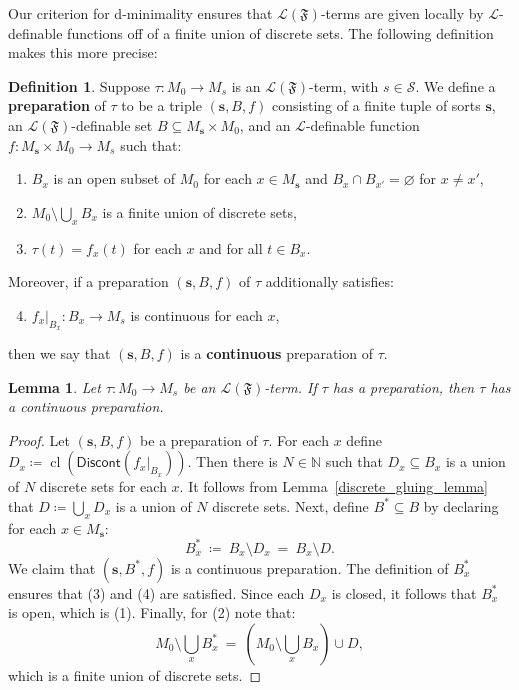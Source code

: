 \documentclass[11pt]{amsart}
\theoremstyle{plain}
\newtheorem{lemma}[thm]{Lemma}
\theoremstyle{definition}
\newtheorem{definition}[thm]{Definition}
\numberwithin{equation}{section}
\newcommand{\fr}{\mathfrak}
\newcommand\N{\mathbb{N}}
\newcommand\calL{\mathcal{L}}
\newcommand\calS{\mathcal{S}}
\newcommand\0{\varnothing}
\begin{document}
\noindent
Our criterion for d-minimality ensures that $\calL(\fr{F})$-terms are given locally by $\calL$-definable functions off of a finite union of discrete sets. The following definition makes this more precise:

\begin{definition}
Suppose $\tau\colon M_0\to M_s$ is an $\calL(\fr{F})$-term, with $s \in \calS$. We define a \textbf{preparation} of $\tau$ to be a triple $(\bm{s},B,f)$ consisting of a finite tuple of sorts $\bm{s}$, an $\calL(\fr{F})$-definable set $B\subseteq M_{\bm{s}}\times M_0$, and an $\calL$-definable function $f \colon M_{\bm{s}}\times M_0\to M_s$ such that:
\begin{enumerate}
\item $B_x$ is an open subset of $M_0$ for each $x\in M_{\bm{s}}$ and $B_x\cap B_{x'}=\0$ for $x\neq x'$,
\item $M_0\setminus \bigcup_{x}B_x$ is a finite union of discrete sets,
\item $\tau(t)=f_x(t)$ for each $x$ and for all $t\in B_x$.
\end{enumerate}
Moreover, if a preparation $(\bm{s},B,f)$ of $\tau$ additionally satisfies:
\begin{enumerate}
\setcounter{enumi}{3}
\item $f_x|_{B_x}\colon B_x\to M_s$ is continuous for each $x$,
\end{enumerate}
then we say that $(\bm{s},B,f)$ is a \textbf{continuous} preparation of $\tau$.
\end{definition}

\begin{lemma}\label{lem:contprep_ms}
Let $\tau\colon M_0\to M_s$ be an $\calL(\fr{F})$-term. 
If $\tau$ has a preparation, then $\tau$ has a continuous preparation.
\end{lemma}
\begin{proof}
Let $(\bm{s},B,f)$ be a preparation of $\tau$.
For each $x$ define $D_x\coloneqq\operatorname{cl}(\mathsf{Discont}(f_x|_{B_x}))$. Then there is $N \in \N$ such that $D_x\subseteq B_x$ is a union of $N$ discrete sets for each $x$.
It follows from Lemma~\ref{discrete_gluing_lemma} that $D\coloneqq\bigcup_{x}D_x$ is a union of $N$ discrete sets. Next, define $B^*\subseteq B$ by declaring for each $x\in M_{\bm{s}}$:
\[
B_x^* \ \coloneqq \ B_x\setminus D_x \ = \ B_x\setminus D.
\]
We claim that $(\bm{s},B^*,f)$ is a continuous preparation. The definition of $B_x^*$ ensures that (3) and (4) are satisfied.
Since each $D_x$ is closed, it follows that $B_x^*$ is open, which is (1). 
Finally, for (2) note that:
\[
\textstyle
M_0\setminus\bigcup_xB_x^* \ =\  (M_0\setminus\bigcup_xB_x)\cup D,
\]
which is a finite union of discrete sets.
\end{proof}
\end{document}
